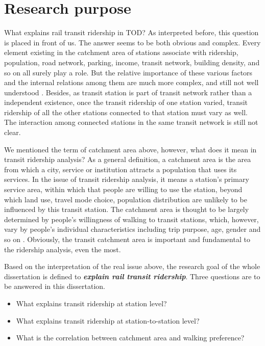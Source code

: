 % 
\section{Research purpose}
What explains rail transit ridership in TOD? As interpreted before, this question is placed in front of us. The answer seems to be both obvious and complex. Every element existing in the catchment area of stations associate with ridership, population, road network, parking, income, transit network, building density, and so on all surely play a role. But the relative importance of these various factors and the internal relations among them are much more complex, and still not well understood \cite{taylor2003factors}. Besides, as transit station is part of transit network rather than a independent existence, once the transit ridership of one station varied, transit ridership of all the other stations connected to that station must vary as well. The interaction among connected stations in the same transit network is still not clear.

We mentioned the term of catchment area above, however, what does it mean in transit ridership analysis? As a general definition, a catchment area is the area from which a city, service or institution attracts a population that uses its services. In the issue of transit ridership analysis, it means a station's primary service area, within which that people are willing to use the station, beyond which land use, travel mode choice, population distribution are unlikely to be influenced by this transit station. The catchment area is thought to be largely determined by people's willingness of walking to transit stations, which, however, vary by people's individual characteristics including trip purpose, age, gender and so on \cite{guerra2013half}. Obviously, the transit catchment area is important and fundamental to the ridership analysis, even the most.

Based on the interpretation of the real issue above, the research goal of the whole dissertation is defined to \emph{\textbf{explain rail transit ridership}}. Three questions are to be answered in this dissertation.

\begin{itemize}
	\item What explains transit ridership at station level?
	\item What explains transit ridership at station-to-station level?
	\item What is the correlation between catchment area and walking preference?
\end{itemize}

